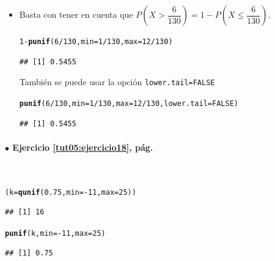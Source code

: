 \documentclass[10pt,a4paper]{article}\usepackage[]{graphicx}\usepackage[]{color}
\makeatletter
\newcommand{\hlnum}[1]{\textcolor[rgb]{0.686,0.059,0.569}{#1}}%
\newcommand{\hlopt}[1]{\textcolor[rgb]{0,0,0}{#1}}%
\newcommand{\hlstd}[1]{\textcolor[rgb]{0.345,0.345,0.345}{#1}}%
\newcommand{\hlkwb}[1]{\textcolor[rgb]{0.69,0.353,0.396}{#1}}%
\newcommand{\hlkwc}[1]{\textcolor[rgb]{0.333,0.667,0.333}{#1}}%
\newcommand{\hlkwd}[1]{\textcolor[rgb]{0.737,0.353,0.396}{\textbf{#1}}}%
\newenvironment{kframe}{%
 \def\at@end@of@kframe{}%
 \ifinner\ifhmode%
  \def\at@end@of@kframe{\end{minipage}}%
  \begin{minipage}{\columnwidth}%
 \fi\fi%
 \def\FrameCommand##1{\hskip\@totalleftmargin \hskip-\fboxsep
 \colorbox{shadecolor}{##1}\hskip-\fboxsep
     \hskip-\linewidth \hskip-\@totalleftmargin \hskip\columnwidth}%
 \MakeFramed {\advance\hsize-\width
   \@totalleftmargin\z@ \linewidth\hsize
   \@setminipage}}%
 {\par\unskip\endMakeFramed%
 \at@end@of@kframe}
\newenvironment{knitrout}{}{} %
\makeatother
\begin{document}
\begin{itemize}
  \item Basta con tener en cuenta que $P\left(X > \dfrac{6}{130}\right) = 1- P\left(X \leq \dfrac{6}{130}\right)$.
\begin{knitrout}
\color{fgcolor}\begin{kframe}
\begin{alltt}
\hlnum{1} \hlopt{-} \hlkwd{punif}\hlstd{(}\hlnum{6}\hlopt{/}\hlnum{130}\hlstd{,} \hlkwc{min}\hlstd{=}\hlnum{1}\hlopt{/}\hlnum{130}\hlstd{,} \hlkwc{max}\hlstd{=}\hlnum{12}\hlopt{/}\hlnum{130}\hlstd{)}
\end{alltt}
\begin{verbatim}
## [1] 0.5455
\end{verbatim}
\end{kframe}
\end{knitrout}
  También se puede usar la opción {\tt lower.tail=FALSE}
\begin{knitrout}
\color{fgcolor}\begin{kframe}
\begin{alltt}
\hlkwd{punif}\hlstd{(}\hlnum{6}\hlopt{/}\hlnum{130}\hlstd{,} \hlkwc{min}\hlstd{=}\hlnum{1}\hlopt{/}\hlnum{130}\hlstd{,} \hlkwc{max}\hlstd{=}\hlnum{12}\hlopt{/}\hlnum{130}\hlstd{,} \hlkwc{lower.tail}\hlstd{=}\hlnum{FALSE}\hlstd{)}
\end{alltt}
\begin{verbatim}
## [1] 0.5455
\end{verbatim}
\end{kframe}
\end{knitrout}


\end{itemize}


\paragraph{\bf $\bullet$ Ejercicio \ref{tut05:ejercicio18}, pág. \pageref{tut05:ejercicio18}}
\label{tut05:ejercicio18:sol}\quad\\

\begin{knitrout}
\color{fgcolor}\begin{kframe}
\begin{alltt}
\hlstd{(k} \hlkwb{=} \hlkwd{qunif}\hlstd{(}\hlnum{0.75}\hlstd{,} \hlkwc{min}\hlstd{=}\hlopt{-}\hlnum{11}\hlstd{,} \hlkwc{max}\hlstd{=}\hlnum{25}\hlstd{))}
\end{alltt}
\begin{verbatim}
## [1] 16
\end{verbatim}
\begin{alltt}
\hlkwd{punif}\hlstd{(k,} \hlkwc{min}\hlstd{=}\hlopt{-}\hlnum{11}\hlstd{,} \hlkwc{max}\hlstd{=}\hlnum{25}\hlstd{)}
\end{alltt}
\begin{verbatim}
## [1] 0.75
\end{verbatim}
\end{kframe}
\end{knitrout}
\end{document}
